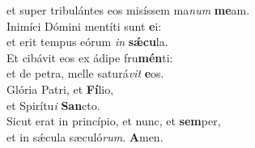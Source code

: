\oddverse et super tribulántes eos misíssem ma\textit{num} \textbf{me}am.\\
\evenverse Inimíci Dómini mentíti sunt \textbf{e}i:~\*\\
\evenverse et erit tempus eórum \textit{in} \textbf{sǽ}\textbf{cu}la.\\
\oddverse Et cibávit eos ex ádipe fru\textbf{mén}ti:~\*\\
\oddverse et de petra, melle saturá\textit{vit} \textbf{e}os.\\
\evenverse Glória Patri, et \textbf{Fí}lio,~\*\\
\evenverse et Spirítu\textit{i} \textbf{San}cto.\\
\oddverse Sicut erat in princípio, et nunc, et \textbf{sem}per,~\*\\
\oddverse et in sǽcula sæculó\textit{rum}. \textbf{A}men.\\
